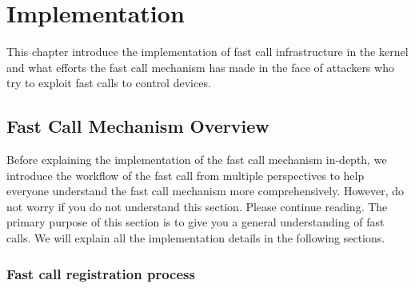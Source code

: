 \chapter{Implementation}
\label{sec:implementation}



This chapter introduce the implementation of fast call infrastructure in the kernel and what efforts the fast call mechanism has 
made in the face of attackers who try to exploit fast calls to control devices.

\section{Fast Call Mechanism Overview}

Before explaining the implementation of the fast call mechanism in-depth, we introduce the workflow of the fast call from multiple perspectives 
to help everyone understand the fast call mechanism more comprehensively. However, do not worry if you do not understand this section. 
Please continue reading. The primary purpose of this section is to give you a general understanding of fast calls. 
We will explain all the implementation details in the following sections.

\subsection{Fast call registration process}


